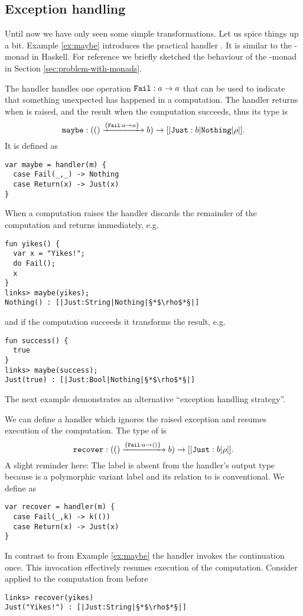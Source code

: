 \subsection{Exception handling}\label{sec:maybehandler}
Until now we have only seen some simple transformations. Let us spice things up a bit. 
Example \ref{ex:maybe} introduces the practical handler . It is similar to the -monad in Haskell. For reference we briefly sketched the behaviour of the -monad in Section \ref{sec:problem-with-monads}.
\begin{example}\label{ex:maybe}
The  handler handles one operation $\texttt{Fail} : a \to a$ that can be used to indicate that something unexpected has happened in a computation. The handler returns  when  is raised, and  the result when the computation succeeds, thus its type is
\[ \texttt{maybe} : (() \xrightarrow{\left\{\texttt{Fail} : a \to a \right\}\;} b) \to [|\texttt{Just}:b|\texttt{Nothing}|\rho|]. \]
It is defined as
\begin{lstlisting}[style=links]
var maybe = handler(m) {
  case Fail(_,_) -> Nothing
  case Return(x) -> Just(x)
}
\end{lstlisting}
When a computation raises  the handler discards the remainder of the computation and returns  immediately, e.g.
\begin{lstlisting}[style=links]
fun yikes() { 
  var x = "Yikes!";
  do Fail();
  x
}
links> maybe(yikes);
Nothing() : [|Just:String|Nothing|§*$\rho$*§|]
\end{lstlisting}
and if the computation succeeds it transforms the result, e.g.
\begin{lstlisting}[style=links]
fun success() {
  true
}
links> maybe(success);
Just(true) : [|Just:Bool|Nothing|§*$\rho$*§|]
\end{lstlisting}
\end{example}
The next example demonstrates an alternative ``exception handling strategy''.
\begin{example}\label{ex:recover}
We can define a handler  which ignores the raised exception and resumes execution of the computation.
The type of  is
\[ \texttt{recover} : (() \xrightarrow{\left\{\texttt{Fail}: a \to () \right\}\;} b) \to [|\texttt{Just}:b|\rho|]. \]
A slight reminder here: The label  is absent from the handler's output type because  is a polymorphic variant label and its relation to  is conventional. We define  as
\begin{lstlisting}[style=links]
var recover = handler(m) {
  case Fail(_,k) -> k(())
  case Return(x) -> Just(x)
}
\end{lstlisting}
In contrast to  from Example \ref{ex:maybe} the  handler invokes the continuation  once. This invocation effectively resumes execution of the computation. Consider  applied to the computation  from before
\begin{lstlisting}[style=links]
links> recover(yikes)
Just("Yikes!") : [|Just:String|§*$\rho$*§|]
\end{lstlisting}
\end{example}
